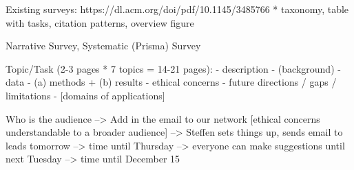 Existing surveys: https://dl.acm.org/doi/pdf/10.1145/3485766 
* taxonomy, table with tasks, citation patterns, overview figure

Narrative Survey, Systematic (Prisma) Survey

Topic/Task (2-3 pages * 7 topics = 14-21 pages):
- description 
- (background)
- data
- (a) methods + (b) results
- ethical concerns
- future directions / gaps / limitations
- [domains of applications]


Who is the audience --> Add in the email to our network [ethical concerns understandable to a broader audience] --> Steffen sets things up, sends email to leads tomorrow --> time until Thursday --> everyone can make suggestions until next Tuesday --> time until December 15